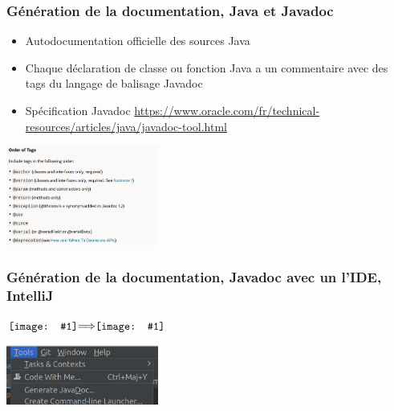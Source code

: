 \documentclass{beamer}
\newcommand*{\vcenterimage}[1]{\vcenter{\hbox{\texttt{[image: \#1]}}}}
\newcommand*{\vcenterarrow}{\vcenter{\hbox{$\Longrightarrow$}}}
\begin{document}
    \begin{frame}
        \transdissolve
        \frametitle{Génération de la documentation, Java et Javadoc}

        \begin{itemize}

            \item Autodocumentation officielle des sources Java
            \item Chaque déclaration de classe ou fonction Java a un commentaire avec des tags du langage de balisage Javadoc
            \item Spécification Javadoc \url{https://www.oracle.com/fr/technical-resources/articles/java/javadoc-tool.html}
        \end{itemize}
        \bigbreak

        \centering
        \includegraphics[width=5cm]{image/javadoc-tags.png}
    \end{frame}

    \begin{frame}
        \transdissolve
        \frametitle{Génération de la documentation, Javadoc avec un l'IDE,  IntelliJ}

        \centering
        $\vcenterimage{image/javadoc-example.png}\vcenterarrow\vcenterimage{image/javadoc.png}$
        \bigbreak

        \includegraphics[width=5cm]{image/generate-button.png}

    \end{frame}
\end{document}
